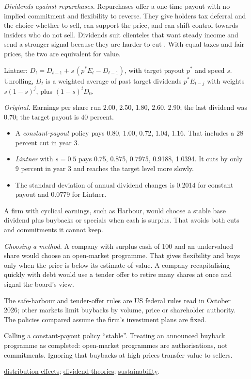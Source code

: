 \begin{qfmethod}
\emph{Dividends against repurchases.} Repurchases offer a one-time payout with no implied commitment and flexibility to reverse. They give holders tax deferral and the choice whether to sell, can support the price, and can shift control towards insiders who do not sell. Dividends suit clienteles that want steady income and send a stronger signal because they are harder to cut \citep[pp.~476--477]{applied-corporate-finance-2014}. With equal taxes and fair prices, the two are equivalent for value.

 Lintner: $D_t=D_{t-1}+s\,(p^{*}E_t-D_{t-1})$, with target payout $p^{*}$ and speed $s$. Unrolling, $D_t$ is a weighted average of past target dividends $p^{*}E_{t-j}$ with weights $s(1-s)^j$, plus $(1-s)^{t}D_0$.

 \emph{Original.} Earnings per share run 2.00, 2.50, 1.80, 2.60, 2.90; the last dividend was 0.70; the target payout is 40 percent.
\begin{itemize}
\item A \emph{constant-payout} policy pays 0.80, 1.00, 0.72, 1.04, 1.16. That includes a 28 percent cut in year 3.
\item \emph{Lintner} with $s=0.5$ pays 0.75, 0.875, 0.7975, 0.9188, 1.0394. It cuts by only 9 percent in year 3 and reaches the target level more slowly.
\item The standard deviation of annual dividend changes is 0.2014 for constant payout and 0.0779 for Lintner.
\end{itemize}
A firm with cyclical earnings, such as Harbour, would choose a stable base dividend plus buybacks or specials when cash is surplus. That avoids both cuts and commitments it cannot keep.

\emph{Choosing a method.} A company with surplus cash of 100 and an undervalued share would choose an open-market programme. That gives flexibility and buys only when the price is below its estimate of value. A company recapitalising quickly with debt would use a tender offer to retire many shares at once and signal the board's view.

 The safe-harbour and tender-offer rules are US federal rules read in October 2026; other markets limit buybacks by volume, price or shareholder authority. The policies compared assume the firm's investment plans are fixed.

 Calling a constant-payout policy ``stable''. Treating an announced buyback programme as completed: open-market programmes are authorisations, not commitments. Ignoring that buybacks at high prices transfer value to sellers.

 \hyperref[meth:distribution-effects]{distribution effects}; \hyperref[meth:dividend-policy-evaluation]{dividend theories}; \hyperref[meth:dividend-sustainability]{sustainability}.

\end{qfmethod}

